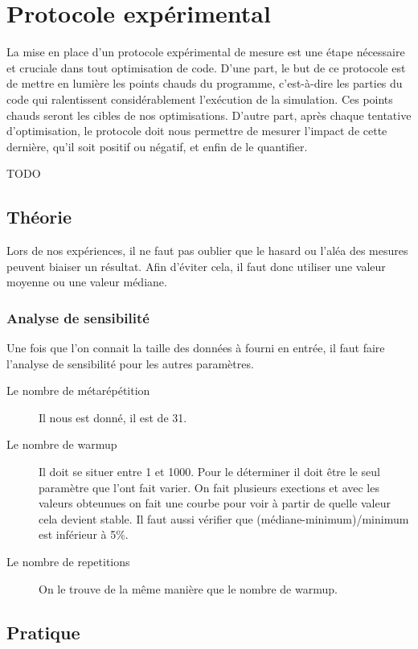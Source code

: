 \documentclass[12pt,a4paper]{article}
\begin{document}
\section{Protocole expérimental}

La mise en place d'un protocole expérimental de mesure est une étape nécessaire
et cruciale dans tout optimisation de code. D'une part, le but de ce protocole
est de mettre en lumière les points chauds du programme, c'est-à-dire les
parties du code qui ralentissent considérablement l'exécution de la simulation.
Ces points chauds seront les cibles de nos optimisations. D'autre part, après
chaque tentative d'optimisation, le protocole doit nous permettre de mesurer
l'impact de cette dernière, qu'il soit positif ou négatif, et enfin de le
quantifier.


TODO



\subsection{Théorie}

Lors de nos expériences, il ne faut pas oublier que le hasard ou l'aléa des
mesures peuvent biaiser un résultat. Afin d'éviter cela, il faut donc utiliser
une valeur moyenne ou une valeur médiane.

\subsubsection{Analyse de sensibilité}

Une fois que l'on connait la taille des données à fourni en entrée, 
il faut faire l'analyse de sensibilité pour les autres paramètres. 
\begin{description}
    \item[Le nombre de métarépétition] Il nous est donné, il est de 31.
    \item[Le nombre de warmup] Il doit se situer entre 1 et 1000. Pour le 
    déterminer il doit être le seul paramètre que l'ont fait varier. On fait 
    plusieurs exections et avec les valeurs obteunues on fait une courbe pour 
    voir à partir de quelle valeur cela devient stable. Il faut aussi vérifier 
    que (médiane-minimum)/minimum est inférieur à 5\%. 
    \item[Le nombre de repetitions] On le trouve de la même manière que 
    le nombre de warmup.
\end{description}


\subsection{Pratique}
\end{document}
